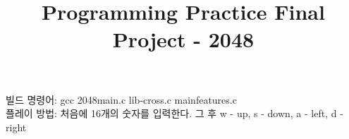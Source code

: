 \documentclass[a4paper, 11pt]{article}
\author{}
\date{}
\title{Programming Practice Final Project - 2048}
\begin{document}
    \begin{titlepage}
        \maketitle
        \tableofcontents
        \newpage
    \end{titlepage}    
    빌드 명령어: gcc 2048main.c lib-cross.c mainfeatures.c\\

    플레이 방법: 처음에 16개의 숫자를 입력한다.
    그 후 w - up, s - down, a - left, d - right
    
\end{document}
